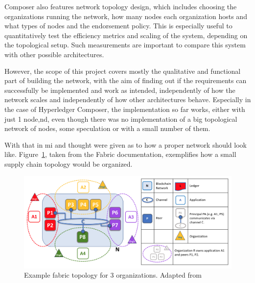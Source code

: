 Composer also features network topology design, which includes choosing the organizations running the network, how many nodes each organization hosts and what types of nodes and the endorsement policy. This is especially useful to quantitatively test the efficiency metrics and scaling of the system, depending on the topological setup. Such measurements are important to compare this system with other possible architectures.

However, the scope of this project covers mostly the qualitative and functional part of building the network, with the aim of finding out if the requirements can successfully be implemented and work as intended, independently of how the network scales and independently of how other architectures behave. Especially in the case of Hyperledger Composer, the implementation so far works, either with just 1 node,nd, even though there was no implementation of a big topological network of nodes, some speculation or with a small number of them. 

With that in mi and thought were given as to how a proper network should look like. Figure~\ref{fig:fabric_topology}, taken from the Fabric documentation, exemplifies how a small supply chain topology would be organized.

\begin{figure}[h]
    \centering
    \includegraphics[scale=0.50]{media/fabric_topology.png}
    \caption[Example fabric topology for 3 organizations.]{Example fabric topology for 3 organizations. Adapted from~\cite{FabricDocPeers}}
    \label{fig:fabric_topology}
\end{figure}





